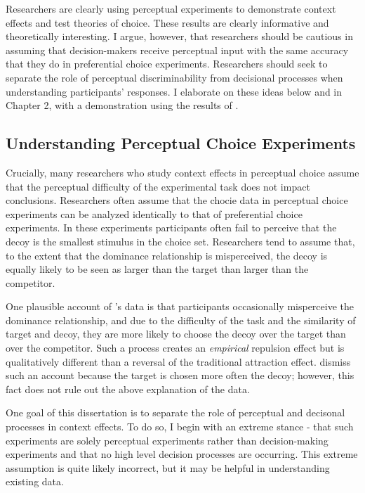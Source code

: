 Researchers are clearly using perceptual experiments to demonstrate context effects and test theories of choice. These results are clearly informative and theoretically interesting. I argue, however, that researchers should be cautious in assuming that decision-makers receive perceptual input with the same accuracy that they do in preferential choice experiments. Researchers should seek to separate the role of perceptual discriminability from decisional processes when understanding participants' responses. I elaborate on these ideas below and in Chapter 2, with a demonstration using the results of \textcite{spektorWhenGoodLooks2018b}.

\subsection{Understanding Perceptual Choice Experiments}

Crucially, many researchers who study context effects in perceptual choice assume that the perceptual difficulty of the experimental task does not impact conclusions. Researchers often assume that the chocie data in perceptual choice experiments can be analyzed identically to that of preferential choice experiments. In these experiments participants often fail to perceive that the decoy is the smallest stimulus in the choice set. Researchers tend to assume that, to the extent that the dominance relationship is misperceived, the decoy is equally likely to be seen as larger than the target than larger than the competitor. 

One plausible account of \textcite{spektorWhenGoodLooks2018b}'s data is that participants occasionally misperceive the dominance relationship, and due to the difficulty of the task and the similarity of target and decoy, they are more likely to choose the decoy over the target than over the competitor. Such a process creates an \textit{empirical} repulsion effect but is qualitatively different than a reversal of the traditional attraction effect. \textcite{spektorWhenGoodLooks2018b} dismiss such an account because the target is chosen more often the decoy; however, this fact does not rule out the above explanation of the data.

One goal of this dissertation is to separate the role of perceptual and decisonal processes in context effects. To do so, I begin with an extreme stance - that such experiments are solely perceptual experiments rather than decision-making experiments and that no high level decision processes are occurring. This extreme assumption is quite likely incorrect, but it may be helpful in understanding existing data.

